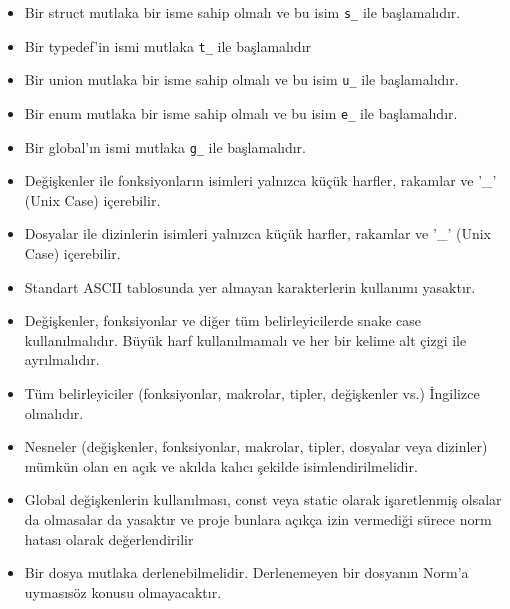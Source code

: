 \documentclass{42-en}
\begin{document}
        \begin{itemize}

            \item Bir struct mutlaka bir isme sahip olmalı ve bu isim \texttt{s\_} ile başlamalıdır.

            \item Bir typedef’in ismi mutlaka \texttt{t\_} ile başlamalıdır

            \item Bir union mutlaka bir isme sahip olmalı ve bu isim \texttt{u\_} ile başlamalıdır.

            \item Bir enum mutlaka bir isme sahip olmalı ve bu isim \texttt{e\_} ile başlamalıdır.

            \item Bir global’ın ismi mutlaka \texttt{g\_} ile başlamalıdır.

            \item Değişkenler ile fonksiyonların isimleri yalnızca küçük harfler, rakamlar ve '\_' (Unix Case) içerebilir.

            \item Dosyalar ile dizinlerin isimleri yalnızca küçük harfler, rakamlar ve '\_' (Unix Case) içerebilir.

            \item Standart ASCII tablosunda yer almayan karakterlerin kullanımı yasaktır.

            \item Değişkenler, fonksiyonlar ve diğer tüm belirleyicilerde snake case kullanılmalıdır. Büyük harf kullanılmamalı ve her bir kelime alt çizgi ile ayrılmalıdır.

            \item Tüm belirleyiciler (fonksiyonlar, makrolar, tipler, değişkenler vs.) İngilizce olmalıdır.

            \item Nesneler (değişkenler, fonksiyonlar, makrolar, tipler, dosyalar veya dizinler) mümkün olan en açık ve
akılda kalıcı şekilde isimlendirilmelidir.

            \item Global değişkenlerin kullanılması, const veya static olarak işaretlenmiş olsalar
da olmasalar da yasaktır ve proje bunlara açıkça izin vermediği sürece norm hatası olarak
değerlendirilir

            \item Bir dosya mutlaka derlenebilmelidir. Derlenemeyen bir dosyanın Norm’a uymasısöz konusu olmayacaktır.

        \end{itemize}
\newpage
\end{document}
